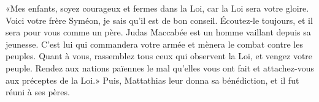 «Mes enfants, soyez courageux et fermes dans la Loi, car la Loi sera votre gloire.
Voici votre frère Syméon, je sais qu’il est de bon conseil.
	Écoutez-le toujours, et il sera pour vous comme un père.
Judas Maccabée est un homme vaillant depuis sa jeunesse.
	C’est lui qui commandera votre armée et mènera le combat contre les peuples.
Quant à vous, rassemblez tous ceux qui observent la Loi, et vengez votre peuple.
Rendez aux nations païennes le mal qu’elles vous ont fait
	et attachez-vous aux préceptes de la Loi.»
Puis, Mattathias leur donna sa bénédiction, et il fut réuni à ses pères.
